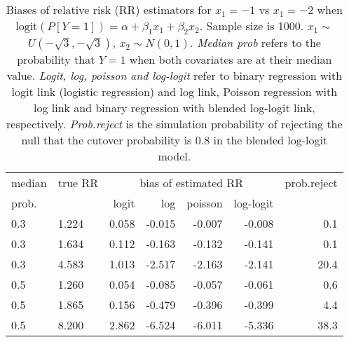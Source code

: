 \documentclass[12pt,a4paper]{article}
\begin{document}
\begin{table}[H] 
\small\sf\centering 
\caption{Biases of relative risk (RR) estimators for $x_1=-1$ vs $x_1=-2$ when $\mbox{logit}(P[Y=1])=\alpha+\beta_1 x_1 + \beta_2 x_2$. Sample size is 1000. $x_1 \sim $$U(-\sqrt{3},-\sqrt{3})$, $x_2 \sim N(0,1)$. {\it Median prob} refers to the probability that $Y=1$ when both covariates are at their median value. {\it Logit, log, poisson and log-logit} refer to binary regression with logit link (logistic regression) and log link, Poisson regression with log link and binary regression with blended log-logit link, respectively. {\it Prob.reject} is the simulation probability of rejecting the null that the cutover probability is $0.8$ in the blended log-logit model.} 
\begin{tabular}{llrrrrr} 
\toprule 
median & true RR & \multicolumn{4}{c}{bias of estimated RR} & prob.reject \\ 
prob. & & logit & log & poisson & log-logit  & \\ \midrule 
0.3 & 1.224 & 0.058 & -0.015 & -0.007 & -0.008 &  0.1 \\  
0.3 & 1.634 & 0.112 & -0.163 & -0.132 & -0.141 &  0.1 \\  
0.3 & 4.583 & 1.013 & -2.517 & -2.163 & -2.141 & 20.4 \\  
0.5 & 1.260 & 0.054 & -0.085 & -0.057 & -0.061 &  0.6 \\  
0.5 & 1.865 & 0.156 & -0.479 & -0.396 & -0.399 &  4.4 \\  
0.5 & 8.200 & 2.862 & -6.524 & -6.011 & -5.336 & 38.3 \\  
\bottomrule 
\end{tabular} 
\end{table} 
\end{document}
